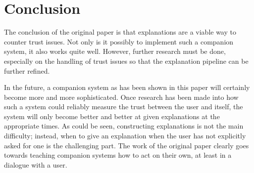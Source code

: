 \documentclass[a4paper]{article}
\begin{document}
\section{Conclusion}

The conclusion of the original paper is that explanations are a viable way to counter trust issues. Not only is it possibly to implement such a companion system, it also works quite well. However, further research must be done, especially on the handling of trust issues so that the explanation pipeline can be further refined.

In the future, a companion system as has been shown in this paper will certainly become more and more sophisticated. Once research has been made into how such a system could reliably measure the trust between the user and itself, the system will only become better and better at given explanations at the appropriate times. As could be seen, constructing explanations is not the main difficulty; instead, when to give an explanation when the user has not explicitly asked for one is the challenging part. The work of the original paper clearly goes towards teaching companion systems how to act on their own, at least in a dialogue with a user.


\end{document}
